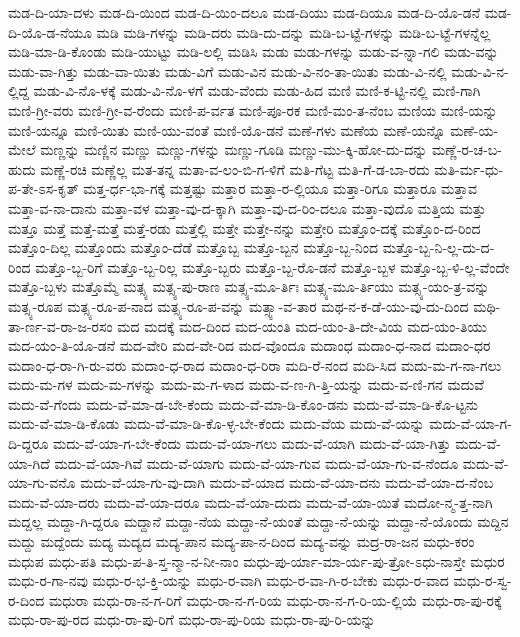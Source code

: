 {ಮಡ-ದಿ-ಯಾ-ದಳು
ಮಡ-ದಿ-ಯಿಂದ
ಮಡ-ದಿ-ಯಿಂ-ದಲೂ
ಮಡ-ದಿಯು
ಮಡ-ದಿಯೂ
ಮಡ-ದಿ-ಯೊ-ಡನೆ
ಮಡ-ದಿ-ಯೊ-ಡ-ನೆಯೂ
ಮಡಿ
ಮಡಿ-ಗಳನ್ನು
ಮಡಿ-ದರು
ಮಡಿ-ದು-ದನ್ನು
ಮಡಿ-ಬ-ಟ್ಟೆ-ಗಳನ್ನು
ಮಡಿ-ಬ-ಟ್ಟೆ-ಗಳನ್ನೆಲ್ಲ
ಮಡಿ-ಮಾ-ಡಿ-ಕೊಂಡು
ಮಡಿ-ಯುಟ್ಟು
ಮಡಿ-ಲಲ್ಲಿ
ಮಡಿಸಿ
ಮಡು
ಮಡು-ಗಳನ್ನು
ಮಡು-ವ-ನ್ನಾ-ಗಲಿ
ಮಡು-ವನ್ನು
ಮಡು-ವಾ-ಗಿತ್ತು
ಮಡು-ವಾ-ಯಿತು
ಮಡು-ವಿಗೆ
ಮಡು-ವಿನ
ಮಡು-ವಿ-ನಂ-ತಾ-ಯಿತು
ಮಡು-ವಿ-ನಲ್ಲಿ
ಮಡು-ವಿ-ನ-ಲ್ಲಿದ್ದ
ಮಡು-ವಿ-ನೊ-ಳಕ್ಕೆ
ಮಡು-ವಿ-ನೊ-ಳಗೆ
ಮಡು-ವೆಂದು
ಮಡು-ಹಿದ
ಮಣಿ
ಮಣಿ-ಕ-ಟ್ಟಿ-ನಲ್ಲಿ
ಮಣಿ-ಗಾಗಿ
ಮಣಿ-ಗ್ರೀ-ವರು
ಮಣಿ-ಗ್ರೀ-ವ-ರೆಂದು
ಮಣಿ-ಪ-ರ್ವತ
ಮಣಿ-ಪೂ-ರಕ
ಮಣಿ-ಮಂ-ತ-ನೆಂಬ
ಮಣಿಯ
ಮಣಿ-ಯನ್ನು
ಮಣಿ-ಯನ್ನೂ
ಮಣಿ-ಯಿತು
ಮಣಿ-ಯು-ವಂತೆ
ಮಣಿ-ಯೊ-ಡನೆ
ಮಣೆ-ಗಳು
ಮಣೆಯ
ಮಣೆ-ಯನ್ನೊ
ಮಣೆ-ಯ-ಮೇಲೆ
ಮಣ್ಣನ್ನು
ಮಣ್ಣಿನ
ಮಣ್ಣು
ಮಣ್ಣು-ಗಳನ್ನು
ಮಣ್ಣು-ಗೂಡಿ
ಮಣ್ಣು-ಮು-ಕ್ಕಿ-ಹೋ-ದು-ದನ್ನು
ಮಣ್ಣೆ-ರ-ಚ-ಬ-ಹುದು
ಮಣ್ಣೆ-ರಚಿ
ಮಣ್ಣೆಲ್ಲ
ಮತ-ತನ್ನ
ಮತಾ-ವ-ಲಂ-ಬಿ-ಗ-ಳಿಗೆ
ಮತಿ-ಗೆಟ್ಟ
ಮತಿ-ಗೆ-ಡ-ಬಾ-ರದು
ಮತಿ-ರ್ಮ-ಧು-ಪ-ತೇ-ಽಸ-ಕೃತ್
ಮತ್ತ-ರ್ಧ-ಭಾ-ಗಕ್ಕೆ
ಮತ್ತಷ್ಟು
ಮತ್ತಾರ
ಮತ್ತಾ-ರ-ಲ್ಲಿಯೂ
ಮತ್ತಾ-ರಿಗೂ
ಮತ್ತಾರೂ
ಮತ್ತಾವ
ಮತ್ತಾ-ವ-ನಾ-ದಾನು
ಮತ್ತಾ-ವಳ
ಮತ್ತಾ-ವು-ದ-ಕ್ಕಾಗಿ
ಮತ್ತಾ-ವು-ದ-ರಿಂ-ದಲೂ
ಮತ್ತಾ-ವುದೊ
ಮತ್ತಿಯ
ಮತ್ತು
ಮತ್ತೂ
ಮತ್ತೆ
ಮತ್ತೆ-ಮತ್ತೆ
ಮತ್ತೆ-ರಡು
ಮತ್ತೆಲ್ಲಿ
ಮತ್ತೇ
ಮತ್ತೇ-ನನ್ನು
ಮತ್ತೇರಿ
ಮತ್ತೊಂ-ದಕ್ಕೆ
ಮತ್ತೊಂ-ದ-ರಿಂದ
ಮತ್ತೊಂ-ದಿಲ್ಲ
ಮತ್ತೊಂದು
ಮತ್ತೊಂ-ದೆಡೆ
ಮತ್ತೊಬ್ಬ
ಮತ್ತೊ-ಬ್ಬನ
ಮತ್ತೊ-ಬ್ಬ-ನಿಂದ
ಮತ್ತೊ-ಬ್ಬ-ನಿ-ಲ್ಲ-ದು-ದ-ರಿಂದ
ಮತ್ತೊ-ಬ್ಬ-ರಿಗೆ
ಮತ್ತೊ-ಬ್ಬ-ರಿಲ್ಲ
ಮತ್ತೊ-ಬ್ಬರು
ಮತ್ತೊ-ಬ್ಬ-ರೊ-ಡನೆ
ಮತ್ತೊ-ಬ್ಬಳ
ಮತ್ತೊ-ಬ್ಬ-ಳಿ-ಲ್ಲ-ವೆಂದೇ
ಮತ್ತೊ-ಬ್ಬಳು
ಮತ್ತೊಮ್ಮೆ
ಮತ್ಸ್ಯ
ಮತ್ಸ್ಯ-ಪು-ರಾಣ
ಮತ್ಸ್ಯ-ಮೂ-ರ್ತಿಃ
ಮತ್ಸ್ಯ-ಮೂ-ರ್ತಿಯು
ಮತ್ಸ್ಯ-ಯಂ-ತ್ರ-ವನ್ನು
ಮತ್ಸ್ಯ-ರೂಪ
ಮತ್ಸ್ಯ-ರೂ-ಪ-ನಾದ
ಮತ್ಸ್ಯ-ರೂ-ಪ-ವನ್ನು
ಮತ್ಸ್ಯಾ-ವ-ತಾರ
ಮಥ-ನ-ಕ-ಡೆ-ಯು-ವು-ದು-ದಿಂದ
ಮಥಿ-ತಾ-ರ್ಣ-ವ-ರಾ-ಜ-ರಸಂ
ಮದ
ಮದಕ್ಕೆ
ಮದ-ದಿಂದ
ಮದ-ಯಂತಿ
ಮದ-ಯಂ-ತಿ-ದೇ-ವಿಯ
ಮದ-ಯಂ-ತಿಯು
ಮದ-ಯಂ-ತಿ-ಯೊ-ಡನೆ
ಮದ-ವೇರಿ
ಮದ-ವೇ-ರಿದ
ಮದ-ವೊಂದೂ
ಮದಾಂಧ
ಮದಾಂ-ಧ-ನಾದ
ಮದಾಂ-ಧರ
ಮದಾಂ-ಧ-ರಾ-ಗಿ-ರು-ವರು
ಮದಾಂ-ಧ-ರಾದ
ಮದಾಂ-ಧ-ರಿರಾ
ಮದಿ-ರೆ-ನಂದ
ಮದಿ-ಸಿದ
ಮದು-ಮ-ಗ-ನಾ-ಗಲು
ಮದು-ಮ-ಗಳ
ಮದು-ಮ-ಗಳನ್ನು
ಮದು-ಮ-ಗ-ಳಾದ
ಮದು-ವ-ಣ-ಗಿ-ತ್ತಿ-ಯನ್ನು
ಮದು-ವ-ಣಿ-ಗನ
ಮದುವೆ
ಮದು-ವೆ-ಗೆಂದು
ಮದು-ವೆ-ಮಾ-ಡ-ಬೇ-ಕೆಂದು
ಮದು-ವೆ-ಮಾ-ಡಿ-ಕೊಂ-ಡನು
ಮದು-ವೆ-ಮಾ-ಡಿ-ಕೊ-ಟ್ಟನು
ಮದು-ವೆ-ಮಾ-ಡಿ-ಕೊಡು
ಮದು-ವೆ-ಮಾ-ಡಿ-ಕೊ-ಳ್ಳ-ಬೇ-ಕೆಂದು
ಮದು-ವೆಯ
ಮದು-ವೆ-ಯನ್ನು
ಮದು-ವೆ-ಯಾ-ಗ-ದಿ-ದ್ದರೂ
ಮದು-ವೆ-ಯಾ-ಗ-ಬೇ-ಕೆಂದು
ಮದು-ವೆ-ಯಾ-ಗಲು
ಮದು-ವೆ-ಯಾಗಿ
ಮದು-ವೆ-ಯಾ-ಗಿತ್ತು
ಮದು-ವೆ-ಯಾ-ಗಿದೆ
ಮದು-ವೆ-ಯಾ-ಗಿವೆ
ಮದು-ವೆ-ಯಾಗು
ಮದು-ವೆ-ಯಾ-ಗುವ
ಮದು-ವೆ-ಯಾ-ಗು-ವ-ನೆಂದೂ
ಮದು-ವೆ-ಯಾ-ಗು-ವನೊ
ಮದು-ವೆ-ಯಾ-ಗು-ವು-ದಾಗಿ
ಮದು-ವೆ-ಯಾದ
ಮದು-ವೆ-ಯಾ-ದನು
ಮದು-ವೆ-ಯಾ-ದ-ನೆಂಬ
ಮದು-ವೆ-ಯಾ-ದರು
ಮದು-ವೆ-ಯಾ-ದರೂ
ಮದು-ವೆ-ಯಾ-ದುದು
ಮದು-ವೆ-ಯಾ-ಯಿತೆ
ಮದೋ-ನ್ಮ-ತ್ತ-ನಾಗಿ
ಮದ್ದಲ್ಲ
ಮದ್ದಾ-ಗಿ-ದ್ದರೂ
ಮದ್ದಾನೆ
ಮದ್ದಾ-ನೆಯ
ಮದ್ದಾ-ನೆ-ಯಂತೆ
ಮದ್ದಾ-ನೆ-ಯನ್ನು
ಮದ್ದಾ-ನೆ-ಯೊಂದು
ಮದ್ದಿನ
ಮದ್ದು
ಮದ್ದೆಂದು
ಮದ್ಯ
ಮದ್ಯದ
ಮದ್ಯ-ಪಾನ
ಮದ್ಯ-ಪಾ-ನ-ದಿಂದ
ಮದ್ಯ-ವನ್ನು
ಮದ್ರ-ರಾ-ಜನ
ಮಧು-ಕರಂ
ಮಧುಪ
ಮಧು-ಪತಿ
ಮಧು-ಪ-ತಿ-ಸ್ತ-ನ್ಮಾ-ನ-ನೀ-ನಾಂ
ಮಧು-ಪು-ರ್ಯಾ-ಮಾ-ರ್ಯ-ಪು-ತ್ರೋ-ಽಧು-ನಾಸ್ತೇ
ಮಧುರ
ಮಧು-ರ-ಗಾ-ನವು
ಮಧು-ರ-ಭ-ಕ್ತಿ-ಯನ್ನು
ಮಧು-ರ-ವಾಗಿ
ಮಧು-ರ-ವಾ-ಗಿ-ರ-ಬೇಕು
ಮಧು-ರ-ವಾದ
ಮಧು-ರ-ಸ್ವ-ರ-ದಿಂದ
ಮಧುರಾ
ಮಧು-ರಾ-ನ-ಗ-ರಿಗೆ
ಮಧು-ರಾ-ನ-ಗ-ರಿಯ
ಮಧು-ರಾ-ನ-ಗ-ರಿ-ಯ-ಲ್ಲಿಯೆ
ಮಧು-ರಾ-ಪು-ರಕ್ಕೆ
ಮಧು-ರಾ-ಪು-ರದ
ಮಧು-ರಾ-ಪು-ರಿಗೆ
ಮಧು-ರಾ-ಪು-ರಿಯ
ಮಧು-ರಾ-ಪು-ರಿ-ಯನ್ನು
}
